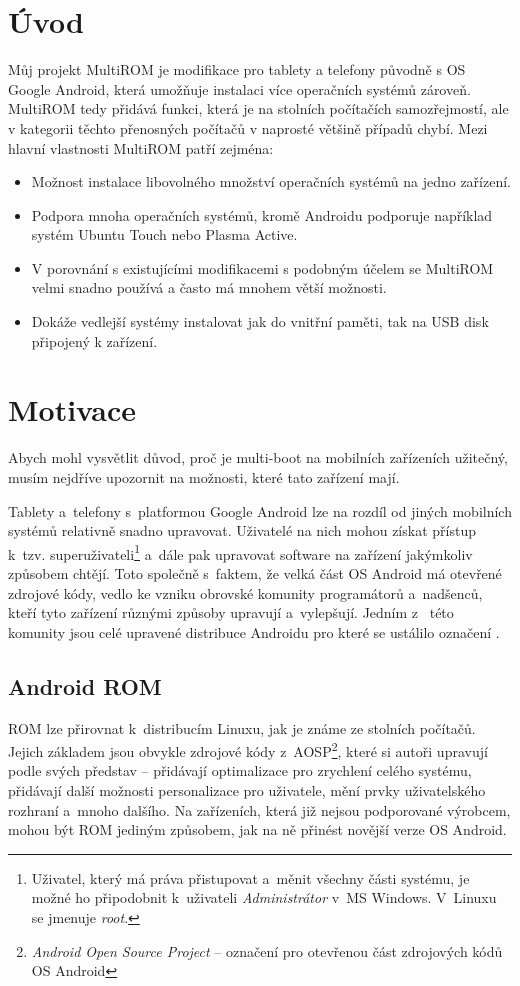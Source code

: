 \documentclass[12pt, a4paper, oneside]{article}
\newcommand{\It}{\textit}  %
\begin{document}
\section*{Úvod}
\label{uvod}
Můj projekt MultiROM je modifikace pro tablety a telefony původně s OS Google Android, která umožňuje instalaci více operačních systémů zároveň. MultiROM tedy přidává funkci, která je na stolních počítačích samozřejmostí, ale v kategorii těchto přenosných počítačů v naprosté většině případů chybí. Mezi hlavní vlastnosti MultiROM patří zejména:

\begin{itemize}
    \item Možnost instalace libovolného množství operačních systémů na jedno zařízení.
    \item Podpora mnoha operačních systémů, kromě Androidu podporuje například systém Ubuntu Touch nebo Plasma Active.
    \item V porovnání s existujícími modifikacemi s podobným účelem se MultiROM velmi snadno používá a často má mnohem větší možnosti.
    \item Dokáže vedlejší systémy instalovat jak do vnitřní paměti, tak na USB disk připojený k zařízení.
\end{itemize}

\section{Motivace}
Abych mohl vysvětlit důvod, proč je multi-boot na mobilních zařízeních užitečný, musím nejdříve upozornit na možnosti, které tato zařízení mají.

Tablety a~telefony s~platformou Google Android lze na rozdíl od jiných mobilních systémů relativně snadno upravovat. Uživatelé na nich mohou získat přístup k~tzv. superuživateli\footnote{Uživatel, který má práva přistupovat a~měnit všechny části systému, je možné ho připodobnit k~uživateli \It{Administrátor} v~MS Windows. V~Linuxu se jmenuje \It{root}.} a~dále pak upravovat software na zařízení jakýmkoliv způsobem chtějí. Toto společně s~faktem, že velká část OS Android má otevřené zdrojové kódy, vedlo ke vzniku obrovské komunity programátorů a~nadšenců, kteří tyto zařízení různými způsoby upravují a~vylepšují. Jedním z~ této komunity jsou celé upravené distribuce Androidu pro které se ustálilo označení .

\subsection{Android ROM}
ROM lze přirovnat k~distribucím Linuxu, jak je známe ze stolních počítačů. Jejich základem jsou obvykle zdrojové kódy z~AOSP\cite{aosp}\footnote{\It{Android Open Source Project} -- označení pro otevřenou část zdrojových kódů OS Android}, které si autoři upravují podle svých představ -- přidávají optimalizace pro zrychlení celého systému, přidávají další možnosti personalizace pro uživatele, mění prvky uživatelského rozhraní a~mnoho dalšího. Na zařízeních, která již nejsou podporované výrobcem, mohou být ROM jediným způsobem, jak na ně přinést novější verze OS Android.
\end{document}
